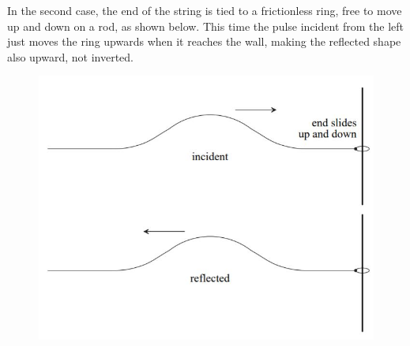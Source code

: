 In the second case, the end of the string is tied to a frictionless ring, free to move up and down on a rod, as shown below. This time the pulse incident from the left just moves the ring upwards when it reaches the wall, making the reflected shape also upward, not inverted. 

\begin{figure}[h!]
    \centering
    \includegraphics[scale=0.9]{notes/images/Reflection-2.JPG}
\end{figure}
\FloatBarrier

